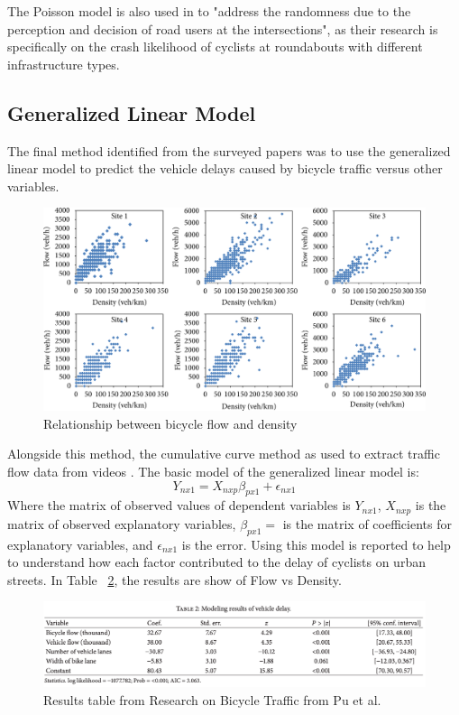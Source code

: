 \documentclass[12pt, letterpaper]{article}
\begin{document}
The Poisson model is also used in \citet{9Cantisani2021} to "address the randomness due to the perception and decision of road users at the intersections", as their research is specifically on the crash likelihood of cyclists at roundabouts with different infrastructure types. 

\subsection{Generalized Linear Model}
\label{sec:gen}

The final method identified from the surveyed papers was to use the generalized linear model to predict the vehicle delays caused by bicycle traffic versus other variables. 

\begin{figure}[hbt!]
    \centering \includegraphics[width=1\textwidth]{flowdensity.png}
    \caption{Relationship between bicycle flow and density}
    \label{fig:flow}
\end{figure}

Alongside this method, the cumulative curve method as used to extract traffic flow data from videos \cite{6Pu2017}. The basic model of the generalized linear model is:
\[Y_{nx1} = X_{nxp}\beta_{px1}+\epsilon_{nx1}\]
Where the matrix of observed values of dependent variables is  $Y_{nx1}$, $X_{nxp}$ is the matrix of observed explanatory variables, $\beta_{px1} =$ is the matrix of coefficients for explanatory variables, and $\epsilon_{nx1}$ is the error. Using this model is reported to help to understand how each factor contributed to the delay of cyclists on urban streets. In Table ~\ref{fig:traffic}, the results are show of Flow vs Density.   
\begin{figure}[hbt!]
    \centering \includegraphics[width=1\textwidth]{BikeTrafficResults.png}
    \caption{Results table from Research on Bicycle Traffic from Pu et al.}
    \label{fig:traffic}
\end{figure}
\end{document}
